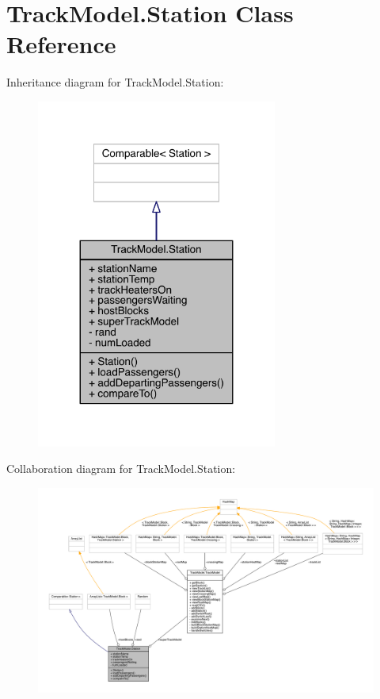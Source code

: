 \hypertarget{classTrackModel_1_1Station}{}\section{Track\+Model.\+Station Class Reference}
\label{classTrackModel_1_1Station}


Inheritance diagram for Track\+Model.\+Station\+:
\nopagebreak
\begin{figure}[H]
\begin{center}
\leavevmode
\includegraphics[width=224pt]{classTrackModel_1_1Station__inherit__graph}
\end{center}
\end{figure}


Collaboration diagram for Track\+Model.\+Station\+:
\nopagebreak
\begin{figure}[H]
\begin{center}
\leavevmode
\includegraphics[width=350pt]{classTrackModel_1_1Station__coll__graph}
\end{center}
\end{figure}
